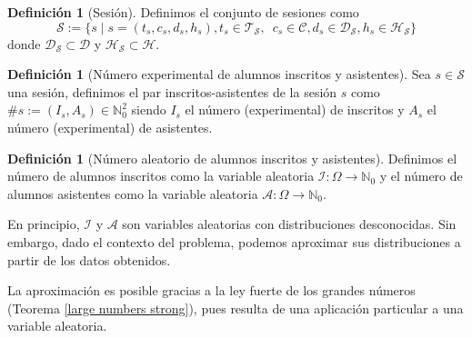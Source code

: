 \documentclass[11pt,a4paper]{book}
\theoremstyle{definition}%
\newtheorem{definicion}[teorema]{Definici\'on}
\newcommand{\Natural}{\mathbb{N}}
\begin{document}
            \begin{definicion}[Sesión]
                Definimos el conjunto de sesiones como
                \begin{equation*}
                    \mathcal{S}:=\{s\mid s=(t_s,c_s,d_s,h_s),t_s\in\mathcal{T}_\mathcal{S},\enspace c_s\in \mathcal{C},d_s\in\mathcal{D}_\mathcal{S},h_s\in\mathcal{H}_\mathcal{S}\}
                \end{equation*}
                donde $\mathcal{D}_\mathcal{S}\subset\mathcal{D}$ y $\mathcal{H}_\mathcal{S}\subset\mathcal{H}$.
            \end{definicion}

            \begin{definicion}[Número experimental de alumnos inscritos y asistentes]
                Sea $s\in\mathcal{S}$ una sesión, definimos el par inscritos-asistentes de la sesión $s$ como $\#s:=(I_s,A_s)\in\Natural_0^2$ siendo $I_s$ el número (experimental) de inscritos y $A_s$ el número (experimental) de asistentes.
            \end{definicion}

            \begin{definicion}[Número aleatorio de alumnos inscritos y asistentes]
                Definimos el número de alumnos inscritos como la variable aleatoria $\mathcal{I}:\Omega\longrightarrow \Natural_0$ y el número de alumnos asistentes como la variable aleatoria $\mathcal{A}:\Omega\longrightarrow \Natural_0$.
            \end{definicion}

            En principio, $\mathcal{I}$ y $\mathcal{A}$ son variables aleatorias con distribuciones desconocidas. Sin embargo, dado el contexto del problema, podemos aproximar sus distribuciones a partir de los datos obtenidos.

            La aproximación es posible gracias a la ley fuerte de los grandes números (Teorema \ref{large numbers strong}), pues resulta de una aplicación particular a una variable aleatoria.
\end{document}
